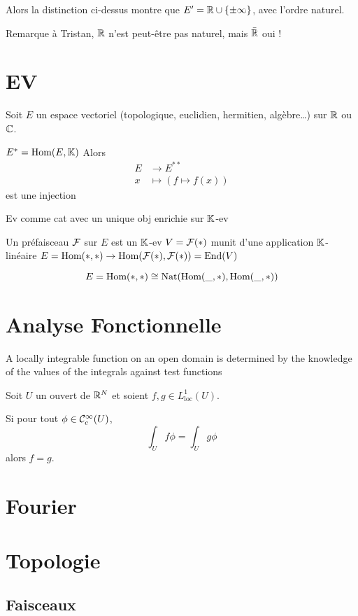 \documentclass[12pt,makeidx, draft]{amsart}
\DeclareMathOperator\Nat{\text{Nat}}
\begin{document}
Alors la distinction ci-dessus montre que $E' = \mathbb{R} \cup \{\pm \infty\}$, avec l'ordre naturel.

Remarque à Tristan, $\mathbb{R}$ n'est peut-être pas naturel, mais $\bar{\mathbb{R}}$ oui !

\section{EV}
Soit $E$ un espace vectoriel (topologique, euclidien, hermitien, algèbre…) sur $\mathbb{R}$ ou $\mathbb{C}$.

$E^* = \text{Hom}(E,\mathbb{K})$
Alors
\begin{align*}
E &\longrightarrow E^{**}\\
x &\mapsto (f \mapsto f(x)) 
\end{align*}
est une injection


Ev comme cat avec un unique obj enrichie sur $\mathbb{K}$-ev

Un préfaisceau $\mathcal{F}$ sur $E$ est un $\mathbb{K}$-ev $V = \mathcal{F}(*)$ munit d'une application $\mathbb{K}$-linéaire $E = \text{Hom}(*,*) \to \text{Hom}(\mathcal{F}(*),\mathcal{F}(*)) = \text{End}(V)$

\begin{equation}
E = \Hom(*,*) \cong \Nat(\Hom(\_,*),\Hom(\_,*))
\end{equation}

\section{Analyse Fonctionnelle}

A locally integrable function on an open domain is determined by the knowledge of the values of the integrals against test functions

Soit $U$ un ouvert de $\mathbb{R}^N$ et soient $f,g \in L^1_{\text{loc}}(U)$. 

Si pour tout $\phi \in \mathcal{C}^\infty_c(U)$, 
\[
\int_U f\phi = \int_U g\phi
\]
alors $f=g$.


\section{Fourier}

\section{Topologie}

\subsection{Faisceaux}
\end{document}
